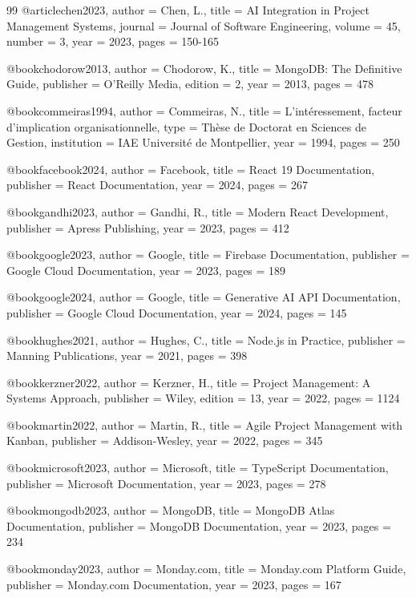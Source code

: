 \begin{thebibliography}{99}
@article{chen2023,
  author = {Chen, L.},
  title = {AI Integration in Project Management Systems},
  journal = {Journal of Software Engineering},
  volume = {45},
  number = {3},
  year = {2023},
  pages = {150-165}
}

@book{chodorow2013,
  author = {Chodorow, K.},
  title = {MongoDB: The Definitive Guide},
  publisher = {O'Reilly Media},
  edition = {2},
  year = {2013},
  pages = {478}
}

@book{commeiras1994,
  author = {Commeiras, N.},
  title = {L'intéressement, facteur d'implication organisationnelle},
  type = {Thèse de Doctorat en Sciences de Gestion},
  institution = {IAE Université de Montpellier},
  year = {1994},
  pages = {250}
}

@book{facebook2024,
  author = {Facebook},
  title = {React 19 Documentation},
  publisher = {React Documentation},
  year = {2024},
  pages = {267}
}

@book{gandhi2023,
  author = {Gandhi, R.},
  title = {Modern React Development},
  publisher = {Apress Publishing},
  year = {2023},
  pages = {412}
}

@book{google2023,
  author = {Google},
  title = {Firebase Documentation},
  publisher = {Google Cloud Documentation},
  year = {2023},
  pages = {189}
}

@book{google2024,
  author = {Google},
  title = {Generative AI API Documentation},
  publisher = {Google Cloud Documentation},
  year = {2024},
  pages = {145}
}

@book{hughes2021,
  author = {Hughes, C.},
  title = {Node.js in Practice},
  publisher = {Manning Publications},
  year = {2021},
  pages = {398}
}

@book{kerzner2022,
  author = {Kerzner, H.},
  title = {Project Management: A Systems Approach},
  publisher = {Wiley},
  edition = {13},
  year = {2022},
  pages = {1124}
}

@book{martin2022,
  author = {Martin, R.},
  title = {Agile Project Management with Kanban},
  publisher = {Addison-Wesley},
  year = {2022},
  pages = {345}
}

@book{microsoft2023,
  author = {Microsoft},
  title = {TypeScript Documentation},
  publisher = {Microsoft Documentation},
  year = {2023},
  pages = {278}
}

@book{mongodb2023,
  author = {MongoDB},
  title = {MongoDB Atlas Documentation},
  publisher = {MongoDB Documentation},
  year = {2023},
  pages = {234}
}

@book{monday2023,
  author = {Monday.com},
  title = {Monday.com Platform Guide},
  publisher = {Monday.com Documentation},
  year = {2023},
  pages = {167}
}


\end{thebibliography}
